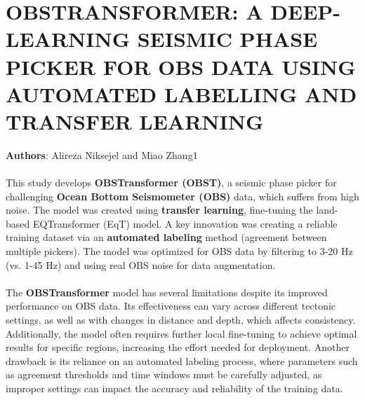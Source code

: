 \documentclass[a4paper,12pt]{report}
\begin{document}
\section{OBSTRANSFORMER: A DEEP-LEARNING SEISMIC PHASE PICKER FOR OBS DATA USING AUTOMATED LABELLING AND TRANSFER LEARNING}
\label{sec:2.12}
\textbf{Authors}: Alireza Niksejel and Miao Zhang1\\
\\
This study develops \textbf{OBSTransformer (OBST)}, a seismic phase picker for challenging \textbf{Ocean Bottom Seismometer (OBS)} data, which suffers from high noise. The model was created using \textbf{transfer learning}, fine-tuning the land-based EQTransformer (EqT) model. A key innovation was creating a reliable training dataset via an \textbf{automated labeling} method (agreement between multiple pickers). The model was optimized for OBS data by filtering to 3-20 Hz (vs. 1-45 Hz) and using real OBS noise for data augmentation.
\\
\\
The \textbf{OBSTransformer} model has several limitations despite its improved performance on OBS data. Its effectiveness can vary across different tectonic settings, as well as with changes in distance and depth, which affects consistency. Additionally, the model often requires further local fine-tuning to achieve optimal results for specific regions, increasing the effort needed for deployment. Another drawback is its reliance on an automated labeling process, where parameters such as agreement thresholds and time windows must be carefully adjusted, as improper settings can impact the accuracy and reliability of the training data.
\end{document}
